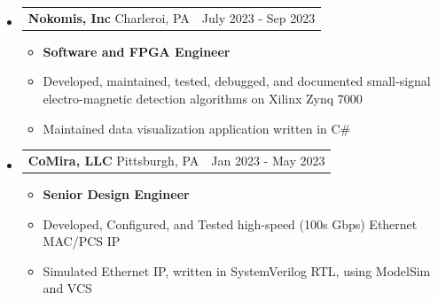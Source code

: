 \documentclass[20pt]{article}
\makeatletter
\providecommand{\tightlist}{
    \setlength{\itemsep}{0pt}\setlength{\parskip}{0pt}
}
\providecommand{\datetable}[2]{
    \begin{tabular*}{\textwidth}{@{}r @{\extracolsep{\fill}} l}
        #1 & #2
    \end{tabular*}
}
\makeatother
\begin{document}
\begin{itemize}[label={}]
\begin{itemize}[topsep=0pt]
        \end{itemize}

        \item \datetable{
            \textbf{Nokomis, Inc} \textbar{} Charleroi, PA
        }{July 2023 - Sep 2023}
        \begin{itemize}[topsep=0pt]\tightlist
            \item \textbf{Software and FPGA Engineer}
            \item Developed, maintained, tested, debugged, and documented small-signal electro-magnetic detection algorithms on Xilinx Zynq 7000
            \item Maintained data visualization application written in C\#
        \end{itemize}

        \item \datetable{
            \textbf{CoMira, LLC} \textbar{} Pittsburgh, PA
        }{Jan 2023 - May 2023}
        \begin{itemize}[topsep=0pt]\tightlist
            \item \textbf{Senior Design Engineer}
            \item Developed, Configured, and Tested high-speed (100s Gbps) Ethernet MAC/PCS IP
            \item Simulated Ethernet IP, written in SystemVerilog RTL, using ModelSim and VCS
        \end{itemize}


\end{itemize}
\end{document}
